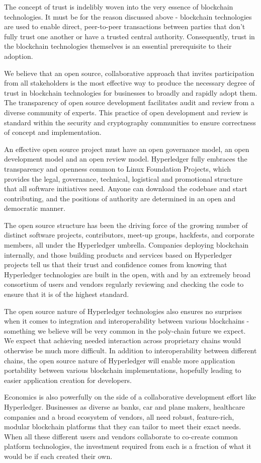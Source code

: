 The concept of trust is indelibly woven into the very essence of blockchain technologies. It must be for the reason discussed above - blockchain technologies are used to enable direct, peer-to-peer transactions between parties that don't fully trust one another or have a trusted central authority. Consequently, trust in the blockchain technologies themselves is an essential prerequisite to their adoption. 

We believe that an open source, collaborative approach that invites participation from all stakeholders is the most effective way to produce the necessary degree of trust in blockchain technologies for businesses to broadly and rapidly adopt them. The transparency of open source development facilitates audit and review from a diverse community of experts. This practice of open development and review is standard within the security and cryptography communities to ensure correctness of concept and implementation.

An effective open source project must have an open governance model, an open development model and an open review model.  Hyperledger fully embraces the transparency and openness common to Linux Foundation Projects, which provides the legal, governance, technical, logistical and promotional structure that all software initiatives need. Anyone can download the codebase and start contributing, and the positions of authority are determined in an open and democratic manner. 

The open source structure has been the driving force of the growing number of distinct software projects, contributors, meet-up groups, hackfests, and corporate members, all under the Hyperledger umbrella.  Companies deploying blockchain internally, and those building products and services based on Hyperledger projects tell us that their trust and confidence comes from knowing that Hyperledger technologies are built in the open, with and by an extremely broad consortium of users and vendors regularly reviewing and checking the code to ensure that it is of the highest standard. 

The open source nature of Hyperledger technologies also ensures no surprises when it comes to integration and interoperability between various blockchains - something we believe will be very common in the poly-chain future we expect. We expect that achieving needed interaction across proprietary chains would otherwise be much more difficult. In addition to interoperability between different chains, the open source nature of Hyperledger will enable more application portability between various blockchain implementations, hopefully leading to easier application creation for developers.

Economics is also powerfully on the side of a collaborative development effort like Hyperledger. Businesses as diverse as banks, car and plane makers, healthcare companies and a broad ecosystem of vendors, all need robust, feature-rich, modular blockchain platforms that they can tailor to meet their exact needs. When all these different users and vendors collaborate to co-create common platform technologies, the investment required from each is a fraction of what it would be if each created their own.
